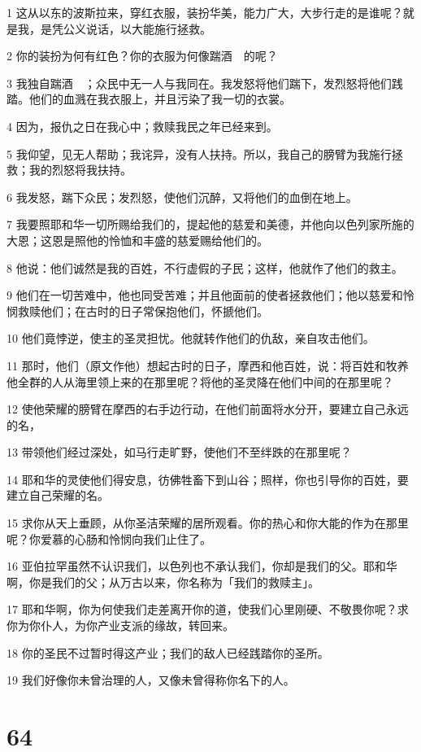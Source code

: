 \par 1 这从以东的波斯拉来，穿红衣服，装扮华美，能力广大，大步行走的是谁呢？就是我，是凭公义说话，以大能施行拯救。
\par 2 你的装扮为何有红色？你的衣服为何像踹酒　的呢？
\par 3 我独自踹酒　；众民中无一人与我同在。我发怒将他们踹下，发烈怒将他们践踏。他们的血溅在我衣服上，并且污染了我一切的衣裳。
\par 4 因为，报仇之日在我心中；救赎我民之年已经来到。
\par 5 我仰望，见无人帮助；我诧异，没有人扶持。所以，我自己的膀臂为我施行拯救；我的烈怒将我扶持。
\par 6 我发怒，踹下众民；发烈怒，使他们沉醉，又将他们的血倒在地上。
\par 7 我要照耶和华一切所赐给我们的，提起他的慈爱和美德，并他向以色列家所施的大恩；这恩是照他的怜恤和丰盛的慈爱赐给他们的。
\par 8 他说：他们诚然是我的百姓，不行虚假的子民；这样，他就作了他们的救主。
\par 9 他们在一切苦难中，他也同受苦难；并且他面前的使者拯救他们；他以慈爱和怜悯救赎他们；在古时的日子常保抱他们，怀搋他们。
\par 10 他们竟悖逆，使主的圣灵担忧。他就转作他们的仇敌，亲自攻击他们。
\par 11 那时，他们（原文作他）想起古时的日子，摩西和他百姓，说：将百姓和牧养他全群的人从海里领上来的在那里呢？将他的圣灵降在他们中间的在那里呢？
\par 12 使他荣耀的膀臂在摩西的右手边行动，在他们前面将水分开，要建立自己永远的名，
\par 13 带领他们经过深处，如马行走旷野，使他们不至绊跌的在那里呢？
\par 14 耶和华的灵使他们得安息，彷佛牲畜下到山谷；照样，你也引导你的百姓，要建立自己荣耀的名。
\par 15 求你从天上垂顾，从你圣洁荣耀的居所观看。你的热心和你大能的作为在那里呢？你爱慕的心肠和怜悯向我们止住了。
\par 16 亚伯拉罕虽然不认识我们，以色列也不承认我们，你却是我们的父。耶和华啊，你是我们的父；从万古以来，你名称为「我们的救赎主」。
\par 17 耶和华啊，你为何使我们走差离开你的道，使我们心里刚硬、不敬畏你呢？求你为你仆人，为你产业支派的缘故，转回来。
\par 18 你的圣民不过暂时得这产业；我们的敌人已经践踏你的圣所。
\par 19 我们好像你未曾治理的人，又像未曾得称你名下的人。

\chapter{64}

